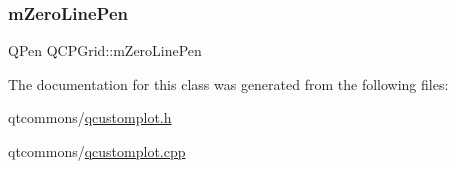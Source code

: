 \mbox{\label{class_q_c_p_grid_a379481871f17655c27eda30af233554f}} 
\subsubsection{\texorpdfstring{mZeroLinePen}{mZeroLinePen}}
{\footnotesize\ttfamily Q\+Pen Q\+C\+P\+Grid\+::m\+Zero\+Line\+Pen\hspace{0.3cm}{\ttfamily [protected]}}



The documentation for this class was generated from the following files\+:\begin{DoxyCompactItemize}
\item 
qtcommons/\mbox{\hyperlink{qcustomplot_8h}{qcustomplot.\+h}}\item 
qtcommons/\mbox{\hyperlink{qcustomplot_8cpp}{qcustomplot.\+cpp}}\end{DoxyCompactItemize}
